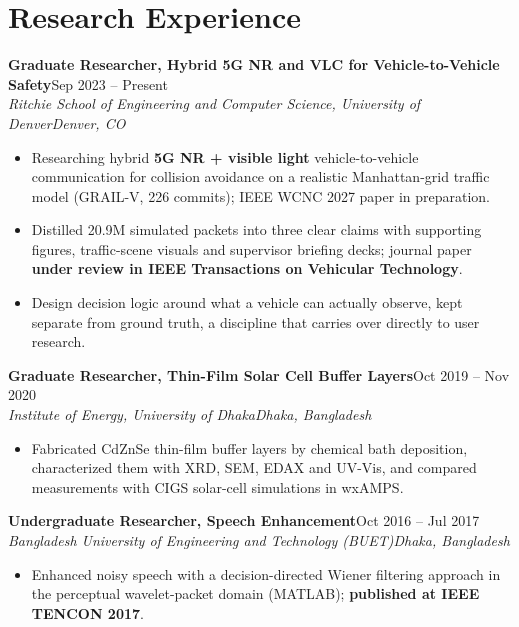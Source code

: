 \documentclass[10pt,letterpaper]{article}
\newcommand{\entry}[4]{\textbf{#1}\hfill #2\\\textit{#3}\hfill\textit{#4}\par}
\begin{document}
\section*{Research Experience}
\entry{Graduate Researcher, Hybrid 5G NR and VLC for Vehicle-to-Vehicle Safety}{Sep 2023 – Present}{Ritchie School of Engineering and Computer Science, University of Denver}{Denver, CO}
\begin{itemize}\item Researching hybrid \textbf{5G NR + visible light} vehicle-to-vehicle communication for collision avoidance on a realistic Manhattan-grid traffic model (GRAIL-V, 226 commits); IEEE WCNC 2027 paper in preparation.\item Distilled 20.9M simulated packets into three clear claims with supporting figures, traffic-scene visuals and supervisor briefing decks; journal paper \textbf{under review in IEEE Transactions on Vehicular Technology}.\item Design decision logic around what a vehicle can actually observe, kept separate from ground truth, a discipline that carries over directly to user research.\end{itemize}
\vspace{2pt}
\entry{Graduate Researcher, Thin-Film Solar Cell Buffer Layers}{Oct 2019 – Nov 2020}{Institute of Energy, University of Dhaka}{Dhaka, Bangladesh}
\begin{itemize}\item Fabricated CdZnSe thin-film buffer layers by chemical bath deposition, characterized them with XRD, SEM, EDAX and UV-Vis, and compared measurements with CIGS solar-cell simulations in wxAMPS.\end{itemize}
\vspace{2pt}
\entry{Undergraduate Researcher, Speech Enhancement}{Oct 2016 – Jul 2017}{Bangladesh University of Engineering and Technology (BUET)}{Dhaka, Bangladesh}
\begin{itemize}\item Enhanced noisy speech with a decision-directed Wiener filtering approach in the perceptual wavelet-packet domain (MATLAB); \textbf{published at IEEE TENCON 2017}.\end{itemize}
\vspace{2pt}
\end{document}
